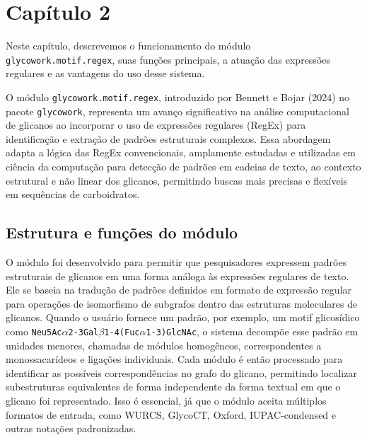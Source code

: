 \chapter{Capítulo 2}

Neste capítulo, descrevemos o funcionamento do módulo
\texttt{glycowork.motif.regex}, suas funções principais, a atuação das
expressões regulares e as vantagens do uso desse sistema.

O módulo \texttt{glycowork.motif.regex}, introduzido por Bennett e Bojar (2024)
no pacote \texttt{glycowork}, representa um avanço significativo na análise
computacional de glicanos ao incorporar o uso de expressões regulares (RegEx)
para identificação e extração de padrões estruturais complexos. Essa abordagem
adapta a lógica das RegEx convencionais, amplamente estudadas e utilizadas em
ciência da computação para detecção de padrões em cadeias de texto, ao contexto
estrutural e não linear dos glicanos, permitindo buscas mais precisas e
flexíveis em sequências de carboidratos.

\section{Estrutura e funções do módulo}

O módulo foi desenvolvido para permitir que pesquisadores expressem padrões
estruturais de glicanos em uma forma análoga às expressões regulares de texto.
Ele se baseia na tradução de padrões definidos em formato de expressão regular
para operações de isomorfismo de subgrafos dentro das estruturas moleculares de
glicanos. Quando o usuário fornece um padrão, por exemplo, um motif glicosídico
como \texttt{Neu5Ac$\alpha$2-3Gal$\beta$1-4(Fuc$\alpha$1-3)GlcNAc}, o sistema
decompõe esse padrão em unidades menores, chamadas de módulos homogêneos,
correspondentes a monossacarídeos e ligações individuais. Cada módulo é então
processado para identificar as possíveis correspondências no grafo do glicano,
permitindo localizar subestruturas equivalentes de forma independente da forma
textual em que o glicano foi representado. Isso é essencial, já que o módulo
aceita múltiplos formatos de entrada, como WURCS, GlycoCT, Oxford,
IUPAC-condensed e outras notações padronizadas.

